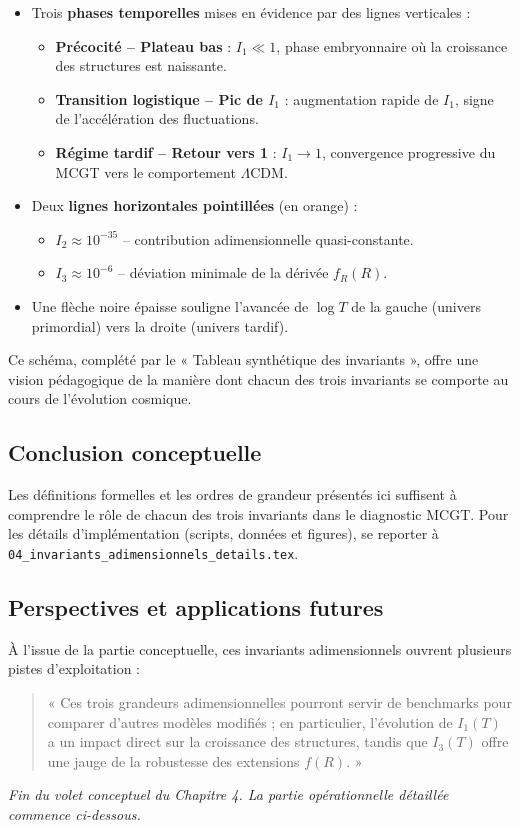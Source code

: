 \begin{itemize}
  \item Trois \textbf{phases temporelles} mises en évidence par des lignes verticales :
    \begin{itemize}
      \item \textbf{Précocité – Plateau bas}  
        : \(I_{1}\ll1\), phase embryonnaire où la croissance des structures est naissante.
      \item \textbf{Transition logistique – Pic de \(I_{1}\)}  
        : augmentation rapide de \(I_{1}\), signe de l’accélération des fluctuations.
      \item \textbf{Régime tardif – Retour vers 1}  
        : \(I_{1}\to1\), convergence progressive du MCGT vers le comportement \(\Lambda\)CDM.
    \end{itemize}
  \item Deux \textbf{lignes horizontales pointillées} (en orange) :
    \begin{itemize}
      \item \(I_{2}\approx10^{-35}\)  -- contribution adimensionnelle quasi-constante.  
      \item \(I_{3}\approx10^{-6}\)   -- déviation minimale de la dérivée \(f_{R}(R)\).
    \end{itemize}
  \item Une flèche noire épaisse souligne l’avancée de \(\log T\)  
        de la gauche (univers primordial) vers la droite (univers tardif).  
\end{itemize}

Ce schéma, complété par le « Tableau synthétique des invariants », offre une vision pédagogique  
de la manière dont chacun des trois invariants se comporte au cours de l’évolution cosmique.

\subsection{Conclusion conceptuelle}
Les définitions formelles et les ordres de grandeur présentés ici suffisent à comprendre le rôle de chacun des trois invariants dans le diagnostic MCGT.
Pour les détails d’implémentation (scripts, données et figures), se reporter à \texttt{04\_invariants\_adimensionnels\_details.tex}.

\subsection{Perspectives et applications futures}

À l’issue de la partie conceptuelle, ces invariants adimensionnels ouvrent plusieurs pistes d’exploitation :

\begin{quote}
« Ces trois grandeurs adimensionnelles pourront servir de benchmarks pour comparer d’autres modèles modifiés ; en particulier, l’évolution de \(I_{1}(T)\) a un impact direct sur la croissance des structures, tandis que \(I_{3}(T)\) offre une jauge de la robustesse des extensions \(f(R)\). »
\end{quote}

\noindent\emph{Fin du volet conceptuel du Chapitre 4. La partie opérationnelle détaillée commence ci-dessous.}